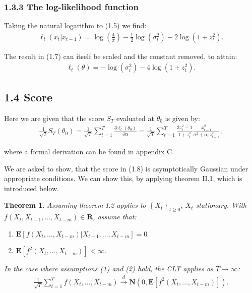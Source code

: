 \documentclass[11pt,a4paper,oneside]{article}
\newcommand{\lp}{\left(}
\newcommand{\rp}{\right)}
\newcommand{\rb}{\right]}
\newcommand{\lb}{\left[}
\newcommand{\lc}{\left\{}
\newcommand{\rc}{\right\}}
\newcommand{\ee}{\mathbf{E}}
\newcommand{\rr}{\mathbf{R}}
\newcommand{\nn}{\mathbf{N}}
\newcommand{\sumt}{\sum_{t=1}^T}
\newtheorem{theorem}{Theorem}
\begin{document}
\subsubsection{1.3.3 The log-likelihood function}
Taking the natural logarithm to (1.5) we find:
\begin{align}
    \ell_t\lp x_t \vert x_{t-1}\rp = \log\lp \frac{4}{\pi}\rp - \frac{1}{2}\log\lp \sigma_t^2\rp - 2\log\lp 1 + z_t^2\rp.
\end{align}

The result in (1.7) can itself be scaled and the constant removed, to attain:
\begin{align}
    \ell_t\lp \theta\rp = - \log\lp \sigma_t^2\rp - 4 \log \lp 1 + z_t^2\rp.
\end{align}

\subsection{1.4 Score}
Here we are given that the score $S_T$ evaluated at $\theta_0$ is given by:
\begin{align}
    \frac{1}{\sqrt{T}} S_T\lp \theta_0\rp
        = \frac{1}{\sqrt{T}}\sumt \frac{\partial \ell_t\lp \theta_0\rp}{\partial \alpha}
        = \frac{1}{\sqrt{T}}\sumt \frac{3z_t^2 - 1}{1 + z_t^2}\frac{x_{t-1}^2}{\sigma^2 + \alpha_0 z_{t-1}^2},
\end{align}

where a formal derivation can be found in appendix C.

We are asked to show, that the score in (1.8) is asymptotically Gaussian under appropriate conditions. We can show this, by applying theorem II.1, which is introduced below.

\begin{theorem}
Assuming theorem I.2 applies to $\lc X_t\rc_{t\geq 0}$, $X_t$ stationary. With $f\lp X_t, X_{t-1}, \dots, X_{t-m}\rp \in \rr$, assume that:
\begin{enumerate}
    \item $\ee\lb f\lp X_t, \dots, X_{t-m}\rp\vert X_{t-1}, \dots, X_{t-m}\rb = 0$
    \item $\ee\lb f^2\lp X_t, \dots, X_{t-m}\rp\rb < \infty$.
\end{enumerate}
In the case where assumptions (1) and (2) hold, the CLT applies as $T\rightarrow \infty$:
\begin{align}
    \frac{1}{\sqrt{T}}\sumt f\lp X_t, \dots, X_{t-m}\rp \overset{d}{\rightarrow} \nn\lp 0, \ee\lb f^2\lp X_t, \dots, X_{t-m}\rp\rb\rp.
\end{align}
\end{theorem}
\end{document}
